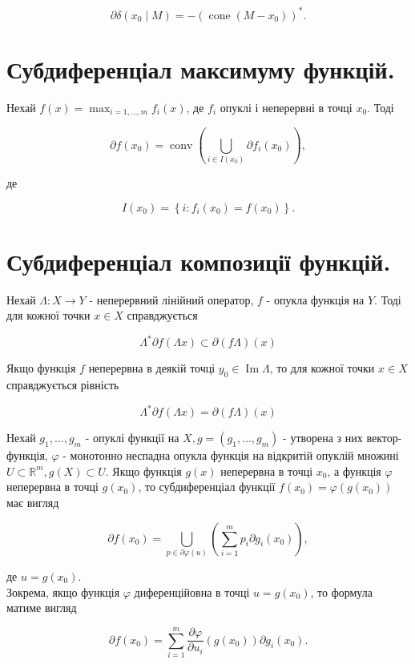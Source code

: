 \documentclass[10pt]{article}
\begin{document}
$$
\partial \delta\left(x_{0} \mid M\right)=-\left(\operatorname{cone}\left(M-x_{0}\right)\right)^{*} .
$$

\section*{Субдиференціал максимуму функцій.}
Нехай $f(x)=\max _{i=1, \ldots, m} f_{i}(x)$, де $f_{i}$ опуклі і неперервні в точці $x_{0}$. Тоді

$$
\partial f\left(x_{0}\right)=\operatorname{conv}\left(\bigcup_{i \in I\left(x_{0}\right)} \partial f_{i}\left(x_{0}\right)\right),
$$

де

$$
I\left(x_{0}\right)=\left\{i: f_{i}\left(x_{0}\right)=f\left(x_{0}\right)\right\} .
$$

\section*{Субдиференціал композиції функцій.}
Нехай $\Lambda: X \rightarrow Y$ - неперервний лінійний оператор, $f$ - опукла функція на $Y$. Тоді для кожної точки $x \in X$ справджується

$$
\Lambda^{*} \partial f(\Lambda x) \subset \partial(f \Lambda)(x)
$$

Якщо функція $f$ неперервна в деякій точці $y_{0} \in \operatorname{Im} \Lambda$, то для кожної точки $x \in X$ справджується рівність

$$
\Lambda^{*} \partial f(\Lambda x)=\partial(f \Lambda)(x)
$$

Нехай $g_{1}, \ldots, g_{m}$ - опуклі функції на $X, g=\left(g_{1}, \ldots, g_{m}\right)$ - утворена з них вектор-функція, $\varphi$ - монотонно неспадна опукла функція на відкритій опуклій множині $U \subset \mathbb{R}^{m}, g(X) \subset U$. Якщо функція $g(x)$ неперервна в точці $x_{0}$, а функція $\varphi$ неперервна в точці $g\left(x_{0}\right)$, то субдиференціал функції $f\left(x_{0}\right)=\varphi\left(g\left(x_{0}\right)\right)$ має вигляд

$$
\partial f\left(x_{0}\right)=\bigcup_{p \in \partial \varphi(u)}\left(\sum_{i=1}^{m} p_{i} \partial g_{i}\left(x_{0}\right)\right),
$$

де $u=g\left(x_{0}\right)$.\\
Зокрема, якщо функція $\varphi$ диференційовна в точці $u=g\left(x_{0}\right)$, то формула матиме вигляд

$$
\partial f\left(x_{0}\right)=\sum_{i=1}^{m} \frac{\partial \varphi}{\partial u_{i}}\left(g\left(x_{0}\right)\right) \partial g_{i}\left(x_{0}\right) .
$$
\end{document}
